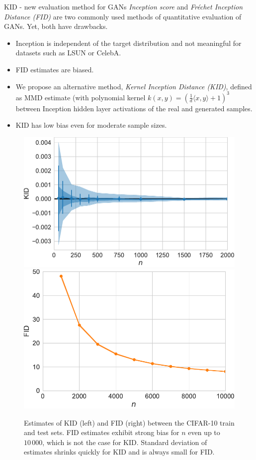 \documentclass[xcolor={table}]{beamer}
\begin{document}
\begin{frame}{}
\begin{columns}[T, totalwidth=\textwidth]
  \begin{column}{.32\textwidth}
    \begin{block}{KID - new evaluation method for GANs}
      \emph{Inception score} and \emph{Fr\'echet Inception Distance (FID)} are two commonly used methods 
      of quantitative evaluation of GANs. Yet, both have drawbacks. 
      \begin{itemize}
        \item Inception is independent of the target distribution and not meaningful for datasets such as LSUN or CelebA.
        \item FID estimates are biased.
        \item We propose an alternative method, \emph{Kernel Inception Distance (KID)}, defined as 
      MMD estimate (with polynomial kernel $k(x,y) = \left(\frac{1}{d}\langle x, y\rangle + 1\right)^3$
      between Inception hidden layer activations of the real and generated samples. 
        \item KID has low bias even for moderate sample sizes.
      \end{itemize}
    \end{block}
    \begin{figure}
      \centering
      \includegraphics[width=.48\columnwidth]{figs/mmd-unbiased.pdf}\quad
      \includegraphics[width=.48\columnwidth]{figs/fid-bias.pdf}
      \caption{Estimates of KID (left) and FID (right) between the CIFAR-10 train and test sets. FID estimates 
        exhibit strong bias for $n$ even up to $10\,000$, which is not the case for KID. 
        Standard deviation of estimates shrinks quickly for KID and is always small for FID.}  %

\end{figure}
\end{column}
\end{columns}
\end{frame}
\end{document}
